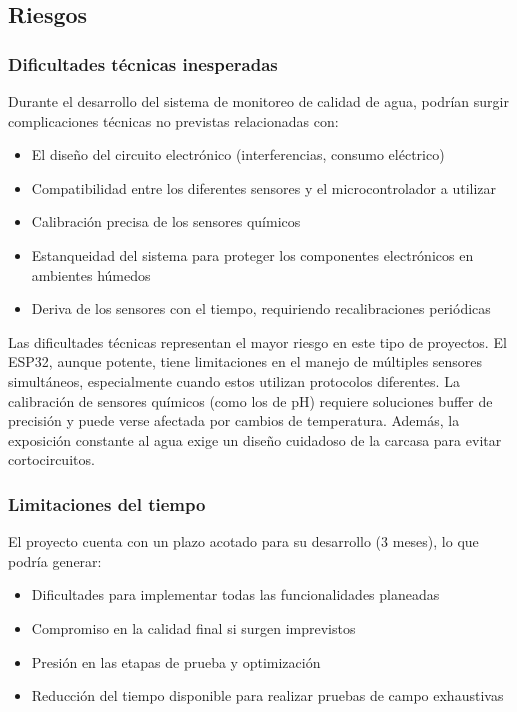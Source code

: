 \documentclass{article}
\begin{document}
\subsection{Riesgos}

\subsubsection{Dificultades técnicas inesperadas}
Durante el desarrollo del sistema de monitoreo de calidad de agua, podrían surgir complicaciones técnicas no previstas relacionadas con:

\begin{itemize}
    \item El diseño del circuito electrónico (interferencias, consumo eléctrico)
    \item Compatibilidad entre los diferentes sensores y el microcontrolador a utilizar
    \item Calibración precisa de los sensores químicos
    \item Estanqueidad del sistema para proteger los componentes electrónicos en ambientes húmedos
    \item Deriva de los sensores con el tiempo, requiriendo recalibraciones periódicas
\end{itemize}

Las dificultades técnicas representan el mayor riesgo en este tipo de proyectos. El ESP32, aunque potente, tiene limitaciones en el manejo de múltiples sensores simultáneos, especialmente cuando estos utilizan protocolos diferentes. La calibración de sensores químicos (como los de pH) requiere soluciones buffer de precisión y puede verse afectada por cambios de temperatura. Además, la exposición constante al agua exige un diseño cuidadoso de la carcasa para evitar cortocircuitos.

\subsubsection{Limitaciones del tiempo}
El proyecto cuenta con un plazo acotado para su desarrollo (3 meses), lo que podría generar:

\begin{itemize}
    \item Dificultades para implementar todas las funcionalidades planeadas
    \item Compromiso en la calidad final si surgen imprevistos
    \item Presión en las etapas de prueba y optimización
    \item Reducción del tiempo disponible para realizar pruebas de campo exhaustivas
\end{itemize}
\end{document}
